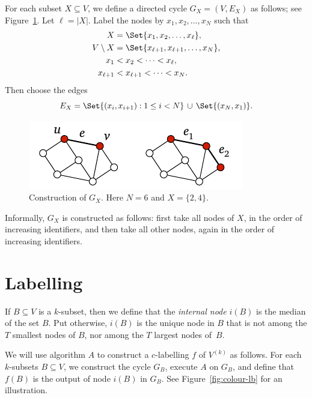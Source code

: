 For each subset $X \subseteq V$, we define a directed cycle $G_X = (V,E_X)$ as follows; see Figure~\ref{fig:subset-cycle}. Let $\ell = |X|$. Label the nodes by $x_1, x_2, \dotsc, x_N$ such that
\begin{align*}
    X &= \Set{ x_1, x_2, \dotsc, x_{\ell} }, \\
    V \setminus X &= \Set{ x_{\ell+1}, x_{\ell+1}, \dotsc, x_N }, \\
    x_1 &< x_2 < \dotsb < x_{\ell}, \\
    x_{\ell+1} &< x_{\ell+1} < \dotsb < x_N.
\end{align*}
Then choose the edges
\[
    E_X = \Set{ (x_i, x_{i+1}) : 1 \le i < N } \, \cup \, \Set{ (x_N,x_1) }.
\]

\begin{figure}
    \centering
    \includegraphics[page=\PSubsetCycle]{figs.pdf}
    \caption{Construction of $G_X$. Here $N = 6$ and $X = \{2,4\}$.}\label{fig:subset-cycle}
\end{figure}

Informally, $G_X$ is constructed as follows: first take all nodes of $X$, in the order of increasing identifiers, and then take all other nodes, again in the order of increasing identifiers.


\section{Labelling}

If $B \subseteq V$ is a $k$-subset, then we define that the \emph{internal node} $i(B)$ is the median of the set $B$. Put otherwise, $i(B)$ is the unique node in $B$ that is not among the $T$ smallest nodes of $B$, nor among the $T$ largest nodes of~$B$.

We will use algorithm $A$ to construct a $c$-labelling $f$ of $V^{(k)}$ as follows. For each $k$-subsets $B \subseteq V$, we construct the cycle $G_B$, execute $A$ on $G_B$, and define that $f(B)$ is the output of node $i(B)$ in $G_B$. See Figure~\ref{fig:colour-lb} for an illustration.


